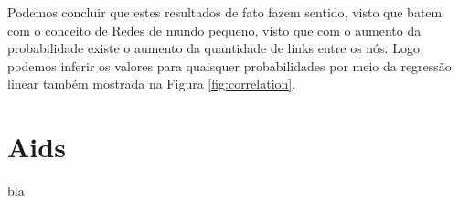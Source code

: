 \documentclass[12pt, letterpaper]{article}
\begin{document}
Podemos concluir que estes resultados de fato fazem sentido, visto que batem com
o conceito de Redes de mundo pequeno, visto que com o aumento da probabilidade
existe o aumento da quantidade de links  entre os nós. Logo podemos inferir os valores para quaisquer
probabilidades por meio da regressão linear também mostrada na Figura \ref{fig:correlation}.



\section{Aids}
bla
\end{document}

